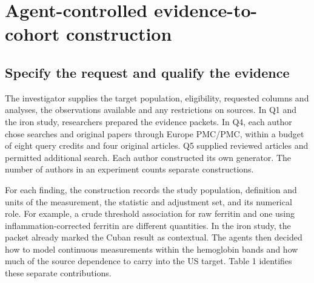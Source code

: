 \documentclass[sigconf,review]{acmart}
\begin{document}
\section{Agent-controlled evidence-to-cohort construction}

\subsection{Specify the request and qualify the evidence}

The investigator supplies the target population, eligibility, requested columns and analyses, the observations available and any restrictions on sources. In Q1 and the iron study, researchers prepared the evidence packets. In Q4, each author chose searches and original papers through Europe PMC/\allowbreak{}PMC, within a budget of eight query credits and four original articles. Q5 supplied reviewed articles and permitted additional search. Each author constructed its own generator. The number of authors in an experiment counts separate constructions.


For each finding, the construction records the study population, definition and units of the measurement, the statistic and adjustment set, and its numerical role. For example, a crude threshold association for raw ferritin and one using inflammation-corrected ferritin are different quantities. In the iron study, the packet already marked the Cuban result as contextual. The agents then decided how to model continuous measurements within the hemoglobin bands and how much of the source dependence to carry into the US target. Table 1 identifies these separate contributions.
\end{document}
